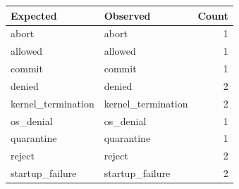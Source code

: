 \begin{tabular}{llr}
Expected & Observed & Count \\
\hline
abort & abort & 1 \\
allowed & allowed & 1 \\
commit & commit & 1 \\
denied & denied & 2 \\
kernel\_termination & kernel\_termination & 2 \\
os\_denial & os\_denial & 1 \\
quarantine & quarantine & 1 \\
reject & reject & 2 \\
startup\_failure & startup\_failure & 2 \\
\end{tabular}
